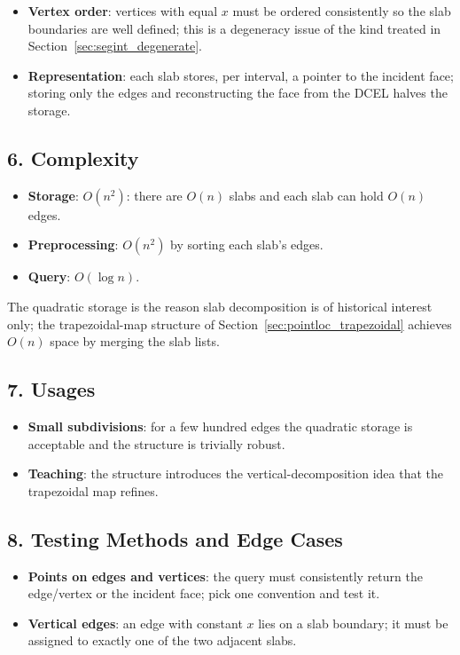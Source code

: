 \begin{itemize}
\item \textbf{Vertex order}: vertices with equal $x$ must be ordered
  consistently so the slab boundaries are well defined; this is a
  degeneracy issue of the kind treated in
  Section~\ref{sec:segint_degenerate}.
\item \textbf{Representation}: each slab stores, per interval, a pointer to
  the incident face; storing only the edges and reconstructing the face from
  the DCEL halves the storage.
\end{itemize}

\subsection{6. Complexity}

\begin{itemize}
\item \textbf{Storage}: $O(n^2)$: there are $O(n)$ slabs and each slab can
  hold $O(n)$ edges.
\item \textbf{Preprocessing}: $O(n^2)$ by sorting each slab's edges.
\item \textbf{Query}: $O(\log n)$.
\end{itemize}
The quadratic storage is the reason slab decomposition is of historical
interest only; the trapezoidal-map structure of
Section~\ref{sec:pointloc_trapezoidal} achieves $O(n)$ space by merging the
slab lists.

\subsection{7. Usages}

\begin{itemize}
\item \textbf{Small subdivisions}: for a few hundred edges the quadratic
  storage is acceptable and the structure is trivially robust.
\item \textbf{Teaching}: the structure introduces the vertical-decomposition
  idea that the trapezoidal map refines.
\end{itemize}

\subsection{8. Testing Methods and Edge Cases}

\begin{itemize}
\item \textbf{Points on edges and vertices}: the query must consistently
  return the edge/vertex or the incident face; pick one convention and test
  it.
\item \textbf{Vertical edges}: an edge with constant $x$ lies on a slab
  boundary; it must be assigned to exactly one of the two adjacent slabs.
\end{itemize}


